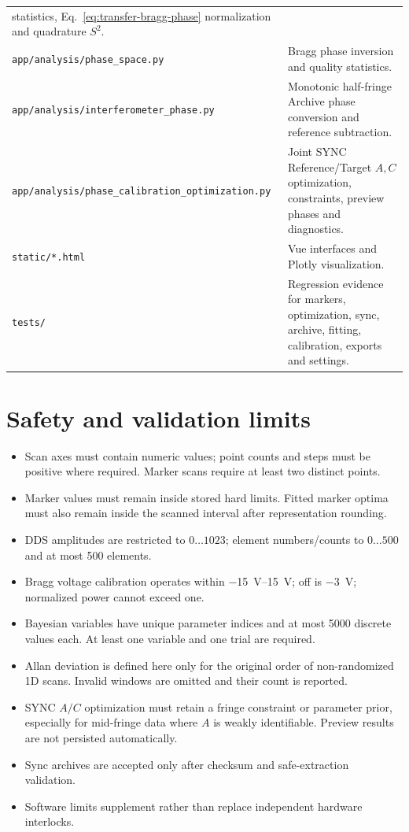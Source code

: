 \documentclass[11pt,oneside,openany]{book}
\newcommand{\pathcode}[1]{\nolinkurl{#1}}
\begin{document}
\begin{longtable}{p{} p{}}
statistics, Eq.~\eqref{eq:transfer-bragg-phase} normalization and quadrature $S^2$.\\
\pathcode{app/analysis/phase_space.py} & Bragg phase inversion and quality statistics.\\
\pathcode{app/analysis/interferometer_phase.py} & Monotonic half-fringe Archive phase
conversion and reference subtraction.\\
\pathcode{app/analysis/phase_calibration_optimization.py} & Joint SYNC Reference/Target
$A,C$ optimization, constraints, preview phases and diagnostics.\\
\pathcode{static/*.html} & Vue interfaces and Plotly visualization.\\
\pathcode{tests/} & Regression evidence for markers, optimization, sync, archive, fitting,
calibration, exports and settings.\\
\bottomrule
\end{longtable}

\chapter{Safety and validation limits}

\begin{itemize}
  \item Scan axes must contain numeric values; point counts and steps must be positive where
  required. Marker scans require at least two distinct points.
  \item Marker values must remain inside stored hard limits. Fitted marker optima must also
  remain inside the scanned interval after representation rounding.
  \item DDS amplitudes are restricted to $0\ldots1023$; element numbers/counts to
  $0\ldots500$ and at most 500 elements.
  \item Bragg voltage calibration operates within \SIrange{-15}{15}{V}; off is
  \SI{-3}{V}; normalized power cannot exceed one.
  \item Bayesian variables have unique parameter indices and at most 5000 discrete values
  each. At least one variable and one trial are required.
  \item Allan deviation is defined here only for the original order of non-randomized 1D
  scans. Invalid windows are omitted and their count is reported.
  \item SYNC $A/C$ optimization must retain a fringe constraint or parameter prior,
  especially for mid-fringe data where $A$ is weakly identifiable. Preview results are
  not persisted automatically.
  \item Sync archives are accepted only after checksum and safe-extraction validation.
  \item Software limits supplement rather than replace independent hardware interlocks.
\end{itemize}
\end{document}

